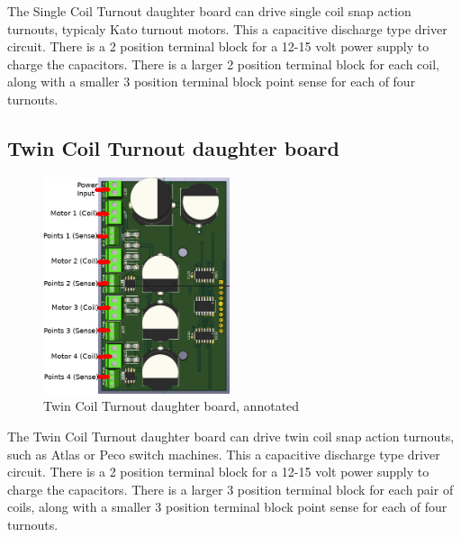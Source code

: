 The Single Coil Turnout daughter board can drive single coil snap action
turnouts, typicaly Kato turnout motors. This a capacitive discharge type
driver circuit. There is a 2 position terminal block for a 12-15 volt power
supply to charge the capacitors.  There is a larger 2 position terminal block 
for each coil, along with a smaller 3 position terminal block point sense for 
each of four turnouts.

\subsection{Twin Coil Turnout daughter board}
\label{sect:TC-Daughter}
\begin{figure}[hbpt]\begin{centering}%
\includegraphics[height=2.5in]{TC-DaughterBoard-Annotated.png}
\caption{Twin Coil Turnout daughter board, annotated}
\end{centering}\end{figure}                                                    
 
The Twin Coil Turnout daughter board can drive twin coil snap action turnouts,
such as Atlas or Peco switch machines. This a capacitive discharge type driver
circuit. There is a 2 position terminal block for a 12-15 volt power supply to
charge the capacitors. There is a larger 3 position terminal block for each
pair of coils, along with a smaller 3 position terminal block point sense for
each of four turnouts.

\clearpage
